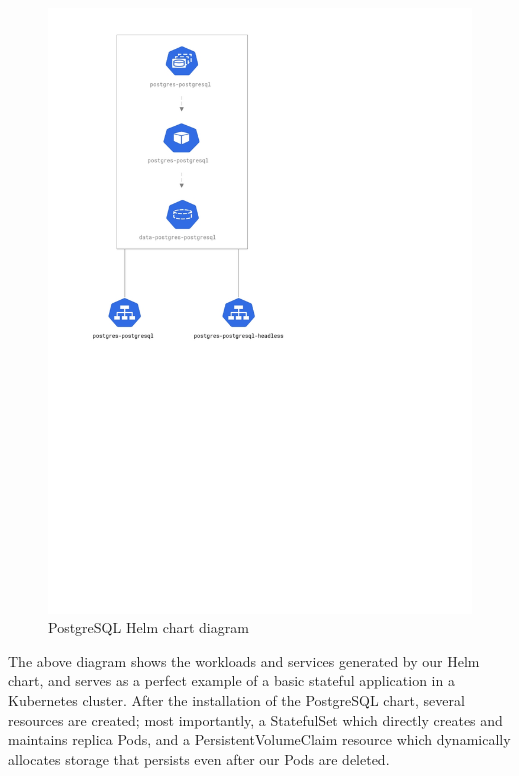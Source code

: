 \documentclass[thesis=B,english]{FITthesis}[2019/12/23]
\begin{document}
\begin{figure}[H]
\centering
\caption{PostgreSQL Helm chart diagram}
\hspace*{0.3cm}
\includegraphics[scale=0.5]{postgres-diagram}
\end{figure}

The above diagram shows the workloads and services generated by our Helm chart, and serves as a perfect example of a basic stateful application in a Kubernetes cluster. After the installation of the PostgreSQL chart, several resources are created; most importantly, a StatefulSet which directly creates and maintains replica Pods, and a PersistentVolumeClaim resource which dynamically allocates storage that persists even after our Pods are deleted.
\end{document}
